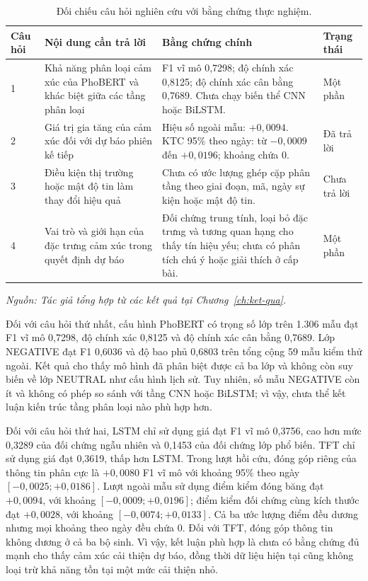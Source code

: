 \documentclass[12pt, a4paper, oneside]{report}
\begin{document}
\begin{table}[H]
  \centering
  \small
  \caption{Đối chiếu câu hỏi nghiên cứu với bằng chứng thực nghiệm.}
  \label{tab:ket-luan-cau-hoi}
  \begin{tabular}{p{1.0cm} p{4.1cm} p{4.8cm} p{2.0cm}}
    \toprule
    Câu hỏi & Nội dung cần trả lời & Bằng chứng chính & Trạng thái \\
    \midrule
    1 & Khả năng phân loại cảm xúc của PhoBERT và khác biệt giữa các tầng phân loại &
    F1 vĩ mô 0,7298; độ chính xác 0,8125; độ chính xác cân bằng 0,7689. Chưa chạy
    biến thể CNN hoặc BiLSTM. & Một phần \\
    2 & Giá trị gia tăng của cảm xúc đối với dự báo phiên kế tiếp &
    Hiệu số ngoài mẫu: $+0{,}0094$. KTC 95\% theo ngày: từ $-0{,}0009$ đến
    $+0{,}0196$; khoảng chứa 0. & Đã trả lời \\
    3 & Điều kiện thị trường hoặc mật độ tin làm thay đổi hiệu quả &
    Chưa có ước lượng ghép cặp phân tầng theo giai đoạn, mã, ngày sự kiện hoặc mật độ
    tin. & Chưa trả lời \\
    4 & Vai trò và giới hạn của đặc trưng cảm xúc trong quyết định dự báo &
    Đối chứng trung tính, loại bỏ đặc trưng và tương quan hạng cho thấy tín hiệu yếu;
    chưa có phân tích chú ý hoặc giải thích ở cấp bài. & Một phần \\
    \bottomrule
  \end{tabular}
\noindent\textit{Nguồn: Tác giả tổng hợp từ các kết quả tại Chương~\ref{ch:ket-qua}.}
\end{table}

Đối với câu hỏi thứ nhất, cấu hình PhoBERT có trọng số lớp trên 1.306 mẫu đạt F1 vĩ
mô 0,7298, độ chính xác 0,8125 và độ chính xác cân bằng 0,7689. Lớp NEGATIVE đạt F1
0,6036 và độ bao phủ 0,6803 trên tổng cộng 59 mẫu kiểm thử ngoài. Kết quả cho thấy mô
hình đã phân biệt được cả ba lớp và không còn suy biến về lớp NEUTRAL như cấu hình
lịch sử. Tuy nhiên, số mẫu NEGATIVE còn ít và không có phép so sánh với tầng CNN hoặc
BiLSTM; vì vậy, chưa thể kết luận kiến trúc tầng phân loại nào phù hợp hơn.

Đối với câu hỏi thứ hai, LSTM chỉ sử dụng giá đạt F1 vĩ mô 0,3756, cao hơn mức 0,3289
của đối chứng ngẫu nhiên và 0,1453 của đối chứng lớp phổ biến. TFT chỉ sử dụng giá đạt
0,3619, thấp hơn LSTM. Trong lượt hồi cứu, đóng góp riêng của thông tin phân cực là
$+0{,}0080$ F1 vĩ mô với khoảng 95\% theo ngày
$[-0{,}0025; +0{,}0186]$. Lượt ngoài mẫu sử dụng điểm kiểm đóng băng đạt
$+0{,}0094$, với khoảng $[-0{,}0009; +0{,}0196]$; điểm kiểm đối chứng cùng kích thước
đạt $+0{,}0028$, với khoảng $[-0{,}0074; +0{,}0133]$. Cả ba ước lượng điểm đều dương
nhưng mọi khoảng theo ngày đều chứa 0. Đối với TFT, đóng góp thông tin không dương ở
cả ba bộ sinh. Vì vậy, kết luận phù hợp là chưa có bằng chứng đủ mạnh cho thấy cảm xúc
cải thiện dự báo, đồng thời dữ liệu hiện tại cũng không loại trừ khả năng tồn tại một
mức cải thiện nhỏ.
\end{document}
